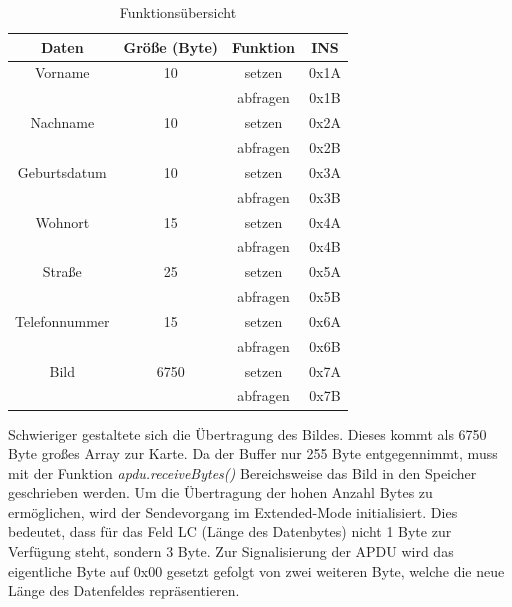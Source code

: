 \documentclass[	a4paper,
			11pt,
			oneside,
			parskip]{scrartcl}
\begin{document}
\begin{table}[H]
  \centering
  \caption{Funktionsübersicht}
    \begin{tabular}{crcc}
    \toprule
    \textbf{Daten} & \multicolumn{1}{c}{\textbf{Größe (Byte)}} & \textbf{Funktion} & \textbf{INS} \\
    \midrule
    Vorname & \multicolumn{1}{c}{10} & setzen & 0x1A \\
          & \multicolumn{1}{c}{} & abfragen & 0x1B \\
    Nachname & \multicolumn{1}{c}{10} & setzen & 0x2A \\
          & \multicolumn{1}{c}{} & abfragen & 0x2B \\
    Geburtsdatum & \multicolumn{1}{c}{10} & setzen & 0x3A \\
          & \multicolumn{1}{c}{} & abfragen & 0x3B \\
    Wohnort & \multicolumn{1}{c}{15} & setzen & 0x4A \\
          & \multicolumn{1}{c}{} & abfragen & 0x4B \\
    Straße & \multicolumn{1}{c}{25} & setzen & 0x5A \\
          & \multicolumn{1}{c}{} & abfragen & 0x5B \\
    Telefonnummer & \multicolumn{1}{c}{15} & setzen & 0x6A \\
          & \multicolumn{1}{c}{} & abfragen & 0x6B \\
    Bild  & \multicolumn{1}{c}{6750} & setzen & 0x7A \\
          &       & abfragen & 0x7B \\
    \bottomrule
    \end{tabular}%
  \label{tab:persdata}%
\end{table}%

Schwieriger gestaltete sich die Übertragung des Bildes. Dieses kommt als 6750 Byte großes Array zur Karte. Da der Buffer nur 255 Byte entgegennimmt, muss mit der Funktion \textit{apdu.receiveBytes()} Bereichsweise das Bild in den Speicher geschrieben werden. Um die Übertragung der hohen Anzahl Bytes zu ermöglichen, wird der Sendevorgang im Extended-Mode initialisiert. Dies bedeutet, dass für das Feld LC (Länge des Datenbytes) nicht 1 Byte zur Verfügung steht, sondern 3 Byte. Zur Signalisierung der APDU wird das eigentliche Byte auf 0x00 gesetzt gefolgt von zwei weiteren Byte, welche die neue Länge des Datenfeldes repräsentieren.
\end{document}

